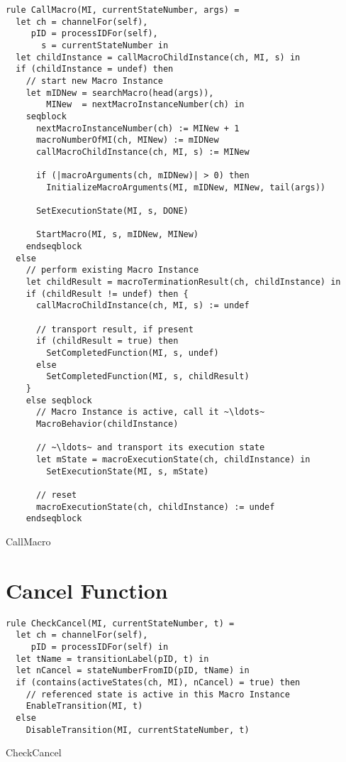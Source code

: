\begin{listing}[H]
\begin{verbatim}
rule CallMacro(MI, currentStateNumber, args) =
  let ch = channelFor(self),
     pID = processIDFor(self),
       s = currentStateNumber in
  let childInstance = callMacroChildInstance(ch, MI, s) in
  if (childInstance = undef) then
    // start new Macro Instance
    let mIDNew = searchMacro(head(args)),
        MINew  = nextMacroInstanceNumber(ch) in
    seqblock
      nextMacroInstanceNumber(ch) := MINew + 1
      macroNumberOfMI(ch, MINew) := mIDNew
      callMacroChildInstance(ch, MI, s) := MINew

      if (|macroArguments(ch, mIDNew)| > 0) then
        InitializeMacroArguments(MI, mIDNew, MINew, tail(args))

      SetExecutionState(MI, s, DONE)

      StartMacro(MI, s, mIDNew, MINew)
    endseqblock
  else
    // perform existing Macro Instance
    let childResult = macroTerminationResult(ch, childInstance) in
    if (childResult != undef) then {
      callMacroChildInstance(ch, MI, s) := undef

      // transport result, if present
      if (childResult = true) then
        SetCompletedFunction(MI, s, undef)
      else
        SetCompletedFunction(MI, s, childResult)
    }
    else seqblock
      // Macro Instance is active, call it ~\ldots~
      MacroBehavior(childInstance)

      // ~\ldots~ and transport its execution state
      let mState = macroExecutionState(ch, childInstance) in
        SetExecutionState(MI, s, mState)

      // reset
      macroExecutionState(ch, childInstance) := undef
    endseqblock
\end{verbatim}
\caption{CallMacro}
\label{lst:asm:CallMacro}
\end{listing}


\section{Cancel Function}


\begin{listing}[H]
\begin{verbatim}
rule CheckCancel(MI, currentStateNumber, t) =
  let ch = channelFor(self),
     pID = processIDFor(self) in
  let tName = transitionLabel(pID, t) in
  let nCancel = stateNumberFromID(pID, tName) in
  if (contains(activeStates(ch, MI), nCancel) = true) then
    // referenced state is active in this Macro Instance
    EnableTransition(MI, t)
  else
    DisableTransition(MI, currentStateNumber, t)
\end{verbatim}
\caption{CheckCancel}
\label{lst:asm:CheckCancel}
\end{listing}




